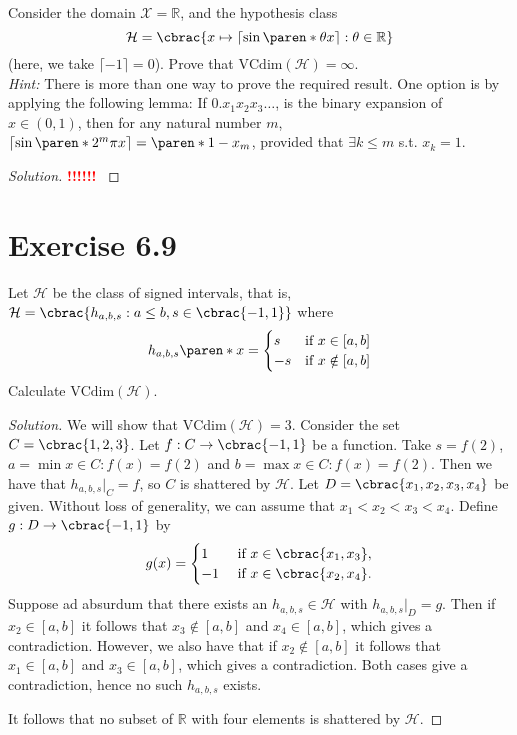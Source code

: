 \documentclass[10pt, a4paper, twoside]{amsart}
\newcommand{\R}{\ensuremath{\mathbb{R}}}
\DeclarePairedDelimiter\cbrac\{\}
\DeclarePairedDelimiter\paren()
\renewcommand{\c}{\ensuremath{\colon}}
\newcommand{\cH}{\ensuremath{\mathcal{H}}}
\newcommand{\cX}{\ensuremath{\mathcal{X}}}
\newenvironment{solution}
               {\let\oldqedsymbol=\qedsymbol
                \renewcommand{\qedsymbol}{$\blacktriangleleft$}
                \begin{proof}[Solution]}
               {\end{proof}
                \renewcommand{\qedsymbol}{\oldqedsymbol}}
\newcommand{\TODO}{\textcolor{red}{\textbf{!!!!!! }}}
\begin{document}
Consider the domain $\cX = \R$, and the hypothesis class
\begin{equation*}
  \cH = \cbrac{x \mapsto \left\lceil \sin\paren*{\theta x} \right\rceil : \theta \in \R }
\end{equation*}
(here, we take $\lceil -1 \rceil = 0$). Prove that $\text{VCdim}(\cH) = \infty$.\\
\textit{Hint:} There is more than one way to prove the required result. One option is by applying the following lemma: If $0 . x_1 x_2 x_3 \ldots$, is the binary expansion of $x \in (0,1)$, then for any natural number $m$, $\lceil \sin \paren*{2^m \pi x} \rceil = \paren*{1-x_m}$, provided that $\exists k \leq m$ s.t. $x_k =1$.
\begin{solution}

\TODO
\end{solution}
\section*{Exercise 6.9}
Let $\cH$ be the class of signed intervals, that is, \\
$\cH = \cbrac{h_{a,b,s}:a \leq b, s \in \cbrac{-1,1}}$ where
\begin{equation*}
  h_{a,b,s}\paren*{x} =
  \begin{cases} 
    s &\mbox{if } x \in [a,b] \\
    -s &\mbox{if } x \notin [a,b]
  \end{cases}
\end{equation*}
Calculate $\text{VCdim}(\cH)$.
 \begin{solution}
  We will show that $\mathrm{VCdim}(\cH)=3$. Consider the set $C=\cbrac{1,2,3}$. Let $f:C \to \cbrac{-1,1}$ be a function.
  Take $s = f(2)$, $a=\min{x \in C \c f(x)=f(2)}$ and $b=\max{x \in C \c f(x)=f(2)}$. Then we have that $h_{a,b,s}|_{C}=f$,
  so $C$ is shattered by $\cH$. Let $D=\cbrac{x_1,x_2,x_3,x_4}$ be given. Without loss of generality, we can assume that $x_1<x_2<x_3<x_4$. Define $g:D\to\cbrac{-1,1}$ by
  \begin{equation*}
   g(x)=
   \begin{cases}
    1 & \text{ if }x\in \cbrac{x_1,x_3}, \\
    -1 & \text{ if }x\in \cbrac{x_2,x_4}.
   \end{cases}
  \end{equation*}
Suppose ad absurdum that there exists an $h_{a,b,s} \in \cH$ with $h_{a,b,s}|_{D}=g$. Then if $x_2 \in [a,b]$ it follows that $x_3  \notin [a,b]$ and $x_4 \in [a,b]$, which gives a contradiction. However, we also have that if $x_2 \notin [a,b]$
it follows that $x_1  \in [a,b]$ and $x_3 \in [a,b]$, which gives a contradiction. 
Both cases give a contradiction, hence no such $h_{a,b,s}$ exists.

It follows that no subset of $\R$ with four elements is shattered by $\cH$.  
 \end{solution}
\end{document}
